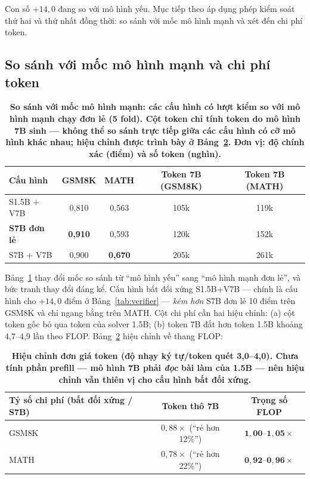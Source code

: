 \documentclass[12pt,a4paper]{article}
\begin{document}
Con số \(+14{,}0\) đang so với mô hình yếu. Mục tiếp theo áp dụng phép kiểm soát thứ hai và thứ nhất đồng thời: so sánh với mốc mô hình mạnh và xét đến chi phí token.

\subsection{So sánh với mốc mô hình mạnh và chi phí token}\label{sec:baseline}

\begin{table}[h]\centering\small
\begin{tabular}{@{}l c c c c@{}}
\toprule
Cấu hình & GSM8K & MATH & Token 7B (GSM8K) & Token 7B (MATH)\\
\midrule
S1.5B + V7B & 0,810 & 0,563 & 105k & 119k\\
\textbf{S7B đơn lẻ} & \textbf{0,910} & 0,593 & 120k & 152k\\
S7B + V7B & 0,900 & \textbf{0,670} & 205k & 261k\\
\bottomrule
\end{tabular}
\caption{\textbf{So sánh với mốc mô hình mạnh: các cấu hình có lượt kiểm so với mô hình mạnh chạy đơn lẻ (5 fold). Cột token chỉ tính token do mô hình 7B sinh --- không thể so sánh trực tiếp giữa các cấu hình có cỡ mô hình khác nhau; hiệu chỉnh được trình bày ở Bảng~\ref{tab:flop}. Đơn vị: độ chính xác (điểm) và số token (nghìn).}}
\label{tab:baseline}
\end{table}

Bảng~\ref{tab:baseline} thay đổi mốc so sánh từ ``mô hình yếu'' sang ``mô hình mạnh đơn lẻ'', và bức tranh thay đổi đáng kể. Cấu hình bất đối xứng S1.5B+V7B --- chính là cấu hình cho \(+14{,}0\) điểm ở Bảng~\ref{tab:verifier} --- \textit{kém hơn} S7B đơn lẻ 10 điểm trên GSM8K và chỉ ngang bằng trên MATH. Cột chi phí cần hai hiệu chỉnh: (a) cột token gốc bỏ qua token của solver 1.5B; (b) token 7B đắt hơn token 1.5B khoảng 4,7--4,9 lần theo FLOP. Bảng~\ref{tab:flop} hiệu chỉnh về thang FLOP:

\begin{table}[h]\centering\small
\begin{tabular}{@{}l c c@{}}
\toprule
Tỷ số chi phí (bất đối xứng / S7B) & Token thô 7B & Trọng số FLOP\\
\midrule
GSM8K & \(0{,}88\times\) (``rẻ hơn 12\%'') & \(\mathbf{1{,}00\text{--}1{,}05\times}\) \\
MATH & \(0{,}78\times\) (``rẻ hơn 22\%'') & \(\mathbf{0{,}92\text{--}0{,}96\times}\) \\
\bottomrule
\end{tabular}
\caption{\textbf{Hiệu chỉnh đơn giá token (độ nhạy ký tự/token quét 3,0--4,0). Chưa tính phần prefill --- mô hình 7B phải \textit{đọc} bài làm của 1.5B --- nên hiệu chỉnh vẫn thiên vị cho cấu hình bất đối xứng.}}
\label{tab:flop}
\end{table}
\end{document}
